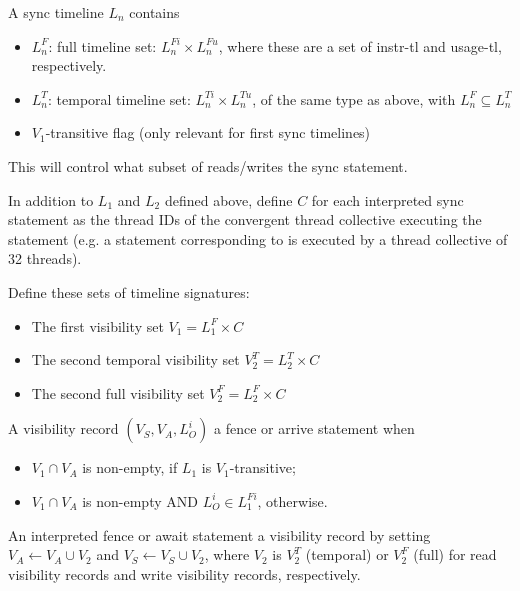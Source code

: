 A sync timeline $L_n$ contains
\begin{itemize}
  \item $L_n^F$: full timeline set: $L_n^{Fi} \times L_n^{Fu}$, where these are a set of instr-tl and usage-tl, respectively.
  \filbreak
  \item $L_n^T$: temporal timeline set: $L_n^{Ti} \times L_n^{Tu}$, of the same type as above, with $L_n^F \subseteq L_n^T$
  \filbreak
  \item $V_1$-transitive flag (only relevant for first sync timelines)
\end{itemize}
\filbreak
This will control what subset of reads/writes  the sync statement.

\filbreak
{}

In addition to $L_1$ and $L_2$ defined above, define $C$ for each interpreted sync statement as the thread IDs of the convergent thread collective executing the statement (e.g. a statement corresponding to  is executed by a thread collective of 32 threads).

\filbreak
Define these sets of timeline signatures:
\begin{itemize}
  \item The first visibility set $V_1 = L_1^F \times C$
  \item The second temporal visibility set $V_2^T = L_2^T \times C$
  \item The second full visibility set $V_2^F = L_2^F \times C$
\end{itemize}

\filbreak
A visibility record $(V_S, V_A, L_O^i)$  a fence or arrive statement when
\begin{itemize}
  \item $V_1 \cap V_A$ is non-empty, if $L_1$ is $V_1$-transitive;
  \filbreak
  \item $V_1 \cap V_A$ is non-empty AND $L_O^i \in L_1^{Fi}$, otherwise.
\end{itemize}
\filbreak

\filbreak
An interpreted fence or await statement  a visibility record by setting $V_A \leftarrow V_A \cup V_2$ and $V_S \leftarrow V_S \cup V_2$, where $V_2$ is $V_2^T$ (temporal) or $V_2^F$ (full) for read visibility records and write visibility records, respectively.

